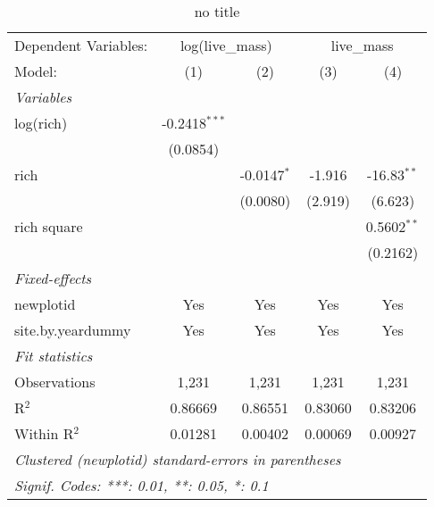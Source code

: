 
\begin{table}[htbp]
   \caption{no title}
   \centering
   \begin{tabular}{lcccc}
      \tabularnewline \midrule \midrule
      Dependent Variables: & \multicolumn{2}{c}{log(live\_mass)} & \multicolumn{2}{c}{live\_mass}\\
      Model:            & (1)             & (2)           & (3)     & (4)\\  
      \midrule
      \emph{Variables}\\
      log(rich)         & -0.2418$^{***}$ &               &         &   \\   
                        & (0.0854)        &               &         &   \\   
      rich              &                 & -0.0147$^{*}$ & -1.916  & -16.83$^{**}$\\   
                        &                 & (0.0080)      & (2.919) & (6.623)\\   
      rich square       &                 &               &         & 0.5602$^{**}$\\   
                        &                 &               &         & (0.2162)\\   
      \midrule
      \emph{Fixed-effects}\\
      newplotid         & Yes             & Yes           & Yes     & Yes\\  
      site.by.yeardummy & Yes             & Yes           & Yes     & Yes\\  
      \midrule
      \emph{Fit statistics}\\
      Observations      & 1,231           & 1,231         & 1,231   & 1,231\\  
      R$^2$             & 0.86669         & 0.86551       & 0.83060 & 0.83206\\  
      Within R$^2$      & 0.01281         & 0.00402       & 0.00069 & 0.00927\\  
      \midrule \midrule
      \multicolumn{5}{l}{\emph{Clustered (newplotid) standard-errors in parentheses}}\\
      \multicolumn{5}{l}{\emph{Signif. Codes: ***: 0.01, **: 0.05, *: 0.1}}\\
   \end{tabular}
\end{table}


